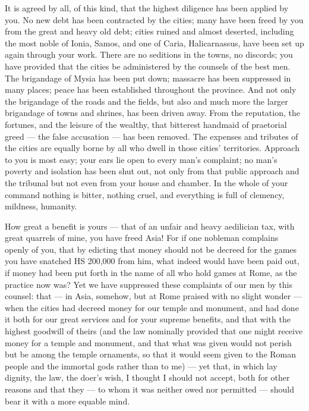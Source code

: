  It is agreed by all, of this kind, that the highest diligence has been applied by you. No new debt has been contracted by the cities; many have been freed by you from the great and heavy old debt; cities ruined and almost deserted, including the most noble of Ionia, Samos, and one of Caria, Halicarnassus, have been set up again through your work. There are no seditions in the towns, no discords; you have provided that the cities be administered by the counsels of the best men. The brigandage of Mysia has been put down; massacre has been suppressed in many places; peace has been established throughout the province. And not only the brigandage of the roads and the fields, but also and much more the larger brigandage of towns and shrines, has been driven away. From the reputation, the fortunes, and the leisure of the wealthy, that bitterest handmaid of praetorial greed --- the false accusation --- has been removed. The expenses and tributes of the cities are equally borne by all who dwell in those cities' territories. Approach to you is most easy; your ears lie open to every man's complaint; no man's poverty and isolation has been shut out, not only from that public approach and the tribunal but not even from your house and chamber. In the whole of your command nothing is bitter, nothing cruel, and everything is full of clemency, mildness, humanity.

 How great a benefit is yours --- that of an unfair and heavy aedilician tax, with great quarrels of mine, you have freed Asia! For if one nobleman complains openly of you, that by edicting that money should not be decreed for the games you have snatched HS 200,000 from him, what indeed would have been paid out, if money had been put forth in the name of all who hold games at Rome, as the practice now was? Yet we have suppressed these complaints of our men by this counsel: that --- in Asia, somehow, but at Rome praised with no slight wonder --- when the cities had decreed money for our temple and monument, and had done it both for our great services and for your supreme benefits, and that with the highest goodwill of theirs (and the law nominally provided that one might receive money for a temple and monument, and that what was given would not perish but be among the temple ornaments, so that it would seem given to the Roman people and the immortal gods rather than to me) --- yet that, in which lay dignity, the law, the doer's wish, I thought I should not accept, both for other reasons and that they --- to whom it was neither owed nor permitted --- should bear it with a more equable mind.

